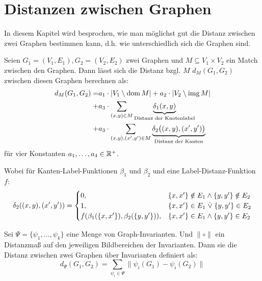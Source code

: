 \chapter{Distanzen zwischen Graphen}

In diesem Kapitel wird besprochen, wie man möglichst gut die Distanz zwischen zwei Graphen bestimmen kann, d.h. wie unterschiedlich sich die Graphen sind.

\begin{definition}
    Seien $ G_1 = (V_1, E_1), G_2 = (V_2, E_2) $ zwei Graphen und $ M \subseteq V_1 \times V_2 $ ein Match zwischen den Graphen.
    Dann lässt sich die Distanz bzgl. $ M $ $ d_M(G_1, G_2) $ zwischen diesen Graphen berechnen als:
    \begin{align*}
        d_M(G_1, G_2) = & a_1 \cdot | V_1 \setminus \operatorname*{dom} M | + a_2 \cdot |V_2 \setminus \operatorname*{img} M| \\
        + & a_3 \cdot \sum_{(x,y) \in M} \underbrace{\delta_1(x, y)}_{\text{Distanz der Knotenlabel}} \\
        + & a_3 \cdot \sum_{(x,y), (x',y') \in M} \underbrace{\delta_2\big((x,y), (x', y')\big)}_{\text{Distanz der Kanten}}
    \end{align*}
    für vier Konstanten $ a_1, \dots, a_4 \in \mathbb{R}^+ $.

    Wobei für Kanten-Label-Funktionen $ \beta_1 $ und $ \beta_2 $ und eine Label-Distanz-Funktion $ f $:
    \begin{equation*}
        \delta_2((x, y), (x', y')) = \begin{cases}
            0, & \{ x, x'\} \notin E_1 \land \{ y, y' \} \notin E_2 \\
            1, & \{ x, x' \} \in E_1 \mathrel{\dot{\lor}} \{ y, y' \} \in E_2 \\
            f(\beta_1(\{ x, x' \}), \beta_2(\{ y, y' \})), & \{ x, x'\} \in E_1 \land \{ y, y' \} \in E_2
        \end{cases}
    \end{equation*}
\end{definition}

\begin{definition}
    Sei $ \Psi = \{ \psi_1, \dots, \psi_k \} $ eine Menge von Graph-Invarianten.
    Und $ \| \circ \| $ ein Distanzmaß auf den jeweiligen Bildbereichen der Invarianten.
    Dann sie die Distanz zwischen zwei Graphen über Invarianten definiert als:
    \begin{equation*}
        d_\Psi(G_1, G_2) = \sum_{\psi_i \in \Psi} \| \psi_i(G_1) - \psi_i(G_2) \|
    \end{equation*}
\end{definition}

